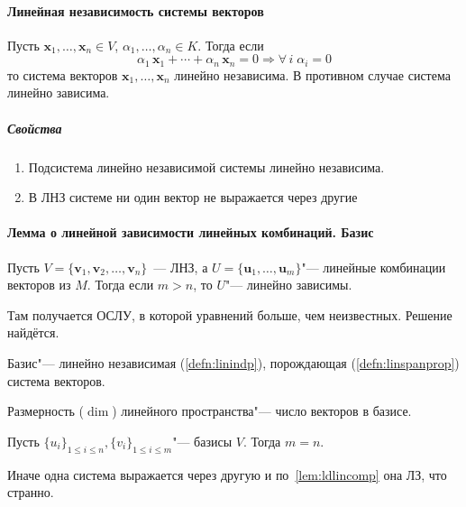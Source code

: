 \documentclass[12pt]{../../../notes}
\begin{document}
\paragraph{Линейная независимость системы векторов}

\begin{defn}\label{defn:linindp} Пусть $\mathbf{x}_1,\dotsc, \mathbf{x}_n \in V$, 
$\alpha_1, \dotsc, \alpha_n \in K$.
Тогда если 
\[
  \alpha_1\,\mathbf{x}_1 + \dotsb + \alpha_n\,\mathbf{x}_n = 0 \Rightarrow \forall\,i\;\alpha_i = 0
\]
то система векторов $\mathbf{x}_1, \dotsc, \mathbf{x}_n$ линейно независима.
В противном случае система линейно зависима.
\end{defn}

\subparagraph{Свойства}
\begin{enumerate}
  \item Подсистема линейно независимой системы линейно независима.
  \item В ЛНЗ системе ни один вектор не выражается через другие
\end{enumerate}

\paragraph{Лемма о линейной зависимости линейных комбинаций. Базис}
\begin{lem}\label{lem:ldlincomp} 
  Пусть $V = \{\mathbf{v}_1, \mathbf{v}_2,\dotsc, \mathbf{v}_n\}$~--- ЛНЗ, а 
  $U = \{\mathbf{u}_1, \dotsc , \mathbf{u}_m\}$"--- линейные комбинации векторов из $M$.
  Тогда если $m > n$, то $U$"--- линейно зависимы.  
\end{lem}

\begin{itlproof} 
  Там получается ОСЛУ, в которой уравнений больше, чем неизвестных.  Решение найдётся.
\end{itlproof}

\begin{defn}\label{defn:basis}
  Базис"--- линейно независимая (\ref{defn:linindp}), порождающая (\ref{defn:linspanprop})
  система векторов.
\end{defn}

\begin{defn}\label{defn:lindim}
  Размерность ($\dim$) линейного пространства"--- число векторов в базисе.
\end{defn}

\begin{lem}\label{lem:lindimcorr}
  Пусть $\{u_i\}_{1 \leqslant i \leqslant n}, \{v_i\}_{1 \leqslant i \leqslant m}$"--- базисы
  $V$. Тогда $m=n$.
\end{lem}
\begin{itlproof}
  Иначе одна система выражается через другую и по~\ref{lem:ldlincomp} она ЛЗ, что странно.
\end{itlproof}
\end{document}
